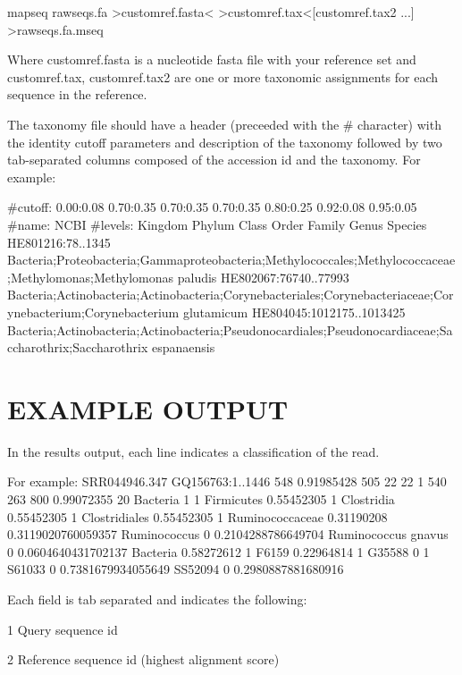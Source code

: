 \documentclass[10pt,a4paper]{article}
\begin{document}
mapseq rawseqs.fa {\textgreater}customref.fasta{\textless} {\textgreater}customref.tax\textless [customref.tax2 ...] \textgreater rawseqs.fa.mseq

Where customref.fasta is a nucleotide fasta file with your reference set and customref.tax, customref.tax2 are one or more taxonomic assignments for each sequence in the reference.

The taxonomy file should have a header (preceeded with the \# character) with the identity cutoff parameters and description of the taxonomy followed by two tab-separated columns composed of the accession id and the taxonomy. For example:

\#cutoff: 0.00:0.08 0.70:0.35 0.70:0.35 0.70:0.35 0.80:0.25 0.92:0.08 0.95:0.05
\#name: NCBI
\#levels: Kingdom Phylum Class Order Family Genus Species
HE801216:78..1345       Bacteria;Proteobacteria;Gammaproteobacteria;Methylococcales;Methylococcaceae;Methylomonas;Methylomonas paludis
HE802067:76740..77993   Bacteria;Actinobacteria;Actinobacteria;Corynebacteriales;Corynebacteriaceae;Corynebacterium;Corynebacterium glutamicum
HE804045:1012175..1013425       Bacteria;Actinobacteria;Actinobacteria;Pseudonocardiales;Pseudonocardiaceae;Saccharothrix;Saccharothrix espanaensis



\section{EXAMPLE OUTPUT}

In the results output, each line indicates a classification of the read.

For example:
SRR044946.347   GQ156763:1..1446        548     0.91985428      505     22      22      1       540     263     800     0.99072355      20              Bacteria        1       1       Firmicutes      0.55452305      1       Clostridia      0.55452305      1       Clostridiales   0.55452305      1       Ruminococcaceae 0.31190208      0.3119020760059357      Ruminococcus    0       0.2104288786649704      Ruminococcus gnavus     0       0.0604640431702137              Bacteria        0.58272612      1       F6159   0.22964814      1       G35588  0       1       S61033  0       0.7381679934055649      SS52094 0       0.2980887881680916

Each field is tab separated and indicates the following:

1       Query sequence id

2       Reference sequence id (highest alignment score)
\end{document}
